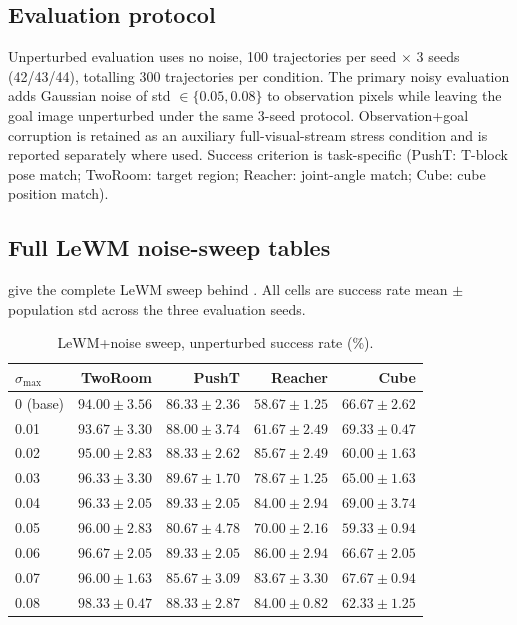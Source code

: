 \documentclass[10pt]{article}
\newcommand{\stdmax}{\ensuremath{\sigma_{\max}}}
\begin{document}
\subsection{Evaluation protocol}
Unperturbed evaluation uses no noise, 100 trajectories per seed $\times$ 3 seeds (42/43/44), totalling 300 trajectories per condition. The primary noisy evaluation adds Gaussian noise of std $\in \{0.05, 0.08\}$ to observation pixels while leaving the goal image unperturbed under the same 3-seed protocol. Observation+goal corruption is retained as an auxiliary full-visual-stream stress condition and is reported separately where used. Success criterion is task-specific (PushT: T-block pose match; TwoRoom: target region; Reacher: joint-angle match; Cube: cube position match).

\subsection{Full LeWM noise-sweep tables}\label{sec:appendix-lewm-sweeps}
 give the complete LeWM sweep behind . All cells are success rate mean $\pm$ population std across the three evaluation seeds.

\begin{table}[H]
\centering
\caption{LeWM+noise sweep, unperturbed success rate (\%).}
\label{tab:sweep-unperturbed}
\small
\begin{tabular}{lrrrr}
\toprule
\stdmax{} & TwoRoom & PushT & Reacher & Cube \\
\midrule
0 (base) & $94.00 \pm 3.56$ & $86.33 \pm 2.36$ & $58.67 \pm 1.25$ & $66.67 \pm 2.62$ \\
0.01 & $93.67 \pm 3.30$ & $88.00 \pm 3.74$ & $61.67 \pm 2.49$ & $69.33 \pm 0.47$ \\
0.02 & $95.00 \pm 2.83$ & $88.33 \pm 2.62$ & $85.67 \pm 2.49$ & $60.00 \pm 1.63$ \\
0.03 & $96.33 \pm 3.30$ & $89.67 \pm 1.70$ & $78.67 \pm 1.25$ & $65.00 \pm 1.63$ \\
0.04 & $96.33 \pm 2.05$ & $89.33 \pm 2.05$ & $84.00 \pm 2.94$ & $69.00 \pm 3.74$ \\
0.05 & $96.00 \pm 2.83$ & $80.67 \pm 4.78$ & $70.00 \pm 2.16$ & $59.33 \pm 0.94$ \\
0.06 & $96.67 \pm 2.05$ & $89.33 \pm 2.05$ & $86.00 \pm 2.94$ & $66.67 \pm 2.05$ \\
0.07 & $96.00 \pm 1.63$ & $85.67 \pm 3.09$ & $83.67 \pm 3.30$ & $67.67 \pm 0.94$ \\
0.08 & $98.33 \pm 0.47$ & $88.33 \pm 2.87$ & $84.00 \pm 0.82$ & $62.33 \pm 1.25$ \\
\bottomrule
\end{tabular}
\end{table}
\end{document}
